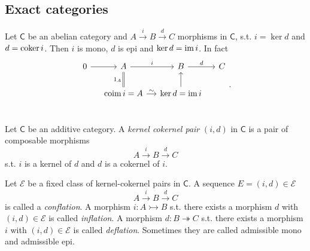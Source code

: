 \subsection{Exact categories}
\begin{rem}
	Let $\mathsf{C}$ be an abelian category and $A \xrightarrow{i} B \xrightarrow{d} C$ morphisms in $\mathsf{C}$, s.t.
	$i = \ker d$ and $d = \operatorname{coker} i$.
	Then $i$ is mono, $d$ is epi and $\ker d = \operatorname{im} i$.
	In fact 
	\begin{equation}
		\begin{tikzcd}[column sep=small]
		0 \arrow[r, "", rightarrow] &
		A \arrow[r, "i", rightarrow] \arrow[d, "1_A"', equal] &
		B \arrow[r, "d", rightarrow] &
		C \\
		& \mathrm{coim}\, i = A \arrow[r, "\sim", rightarrow] &
		\ker d = \ima i \arrow[u, "", rightarrow] & \\
	\end{tikzcd}
	.\end{equation} 
\end{rem}

\begin{defn}
	Let $\mathsf{C}$ be an additive category.
	A {\em kernel cokernel pair} $\left(i, d\right)$ in $\mathsf{C}$ is a pair of composable morphisms
	\begin{equation}
	A \xrightarrow{i} B \xrightarrow{d} C
	\end{equation} 
	s.t. $i$ is a kernel of $d$ and $d$ is a cokernel of $i$.
\end{defn}

\begin{defn}
	Let $\mathcal{E}$ be a fixed class of kernel-cokernel pairs in $\mathsf{C}$.
	A sequence $E = \left(i, d\right) \in \mathcal{E}$
	\begin{equation}
	A \xrightarrow{i} B \xrightarrow{d} C
	\end{equation} 
	is called a {\em conflation}.
	A morphism $i\colon A \rightarrowtail B$ s.t. there exists a morphism $d$ with $\left(i, d\right) \in \mathcal{E}$ is called {\em inflation}.
	A morphism $d\colon B \twoheadrightarrow C$ s.t. there exists a morphism $i$ with $\left(i, d\right) \in \mathcal{E}$ is called {\em deflation}.
	Sometimes they are called admissible mono and admissible epi.
\end{defn}

